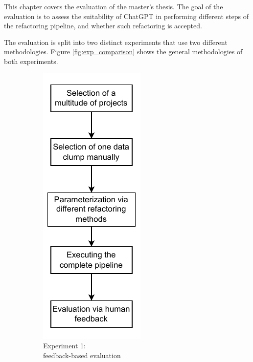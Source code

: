 This chapter covers the evaluation of the master's thesis. The goal of the evaluation is to assess the suitability of ChatGPT in performing  different steps of the refactoring pipeline, and whether such refactoring is accepted.



The evaluation is split into two distinct experiments that use two different methodologies. Figure \ref{fig:exp_comparison} shows the general methodologies of both experiments. 

\begin{figure}[ht!]
    \centering
   \begin{subfigure}[t]{0.49\columnwidth}
   \centering
    \includegraphics[]{figures/chapter5/evalPartASequence.drawio.pdf}
    \caption{Experiment 1:\\
    feedback-based evaluation}
    \label{fig:exp1_sequence}
    \end{subfigure}
     \begin{subfigure}[t]{0.49\columnwidth}
     \centering

\end{subfigure}
\end{figure}
